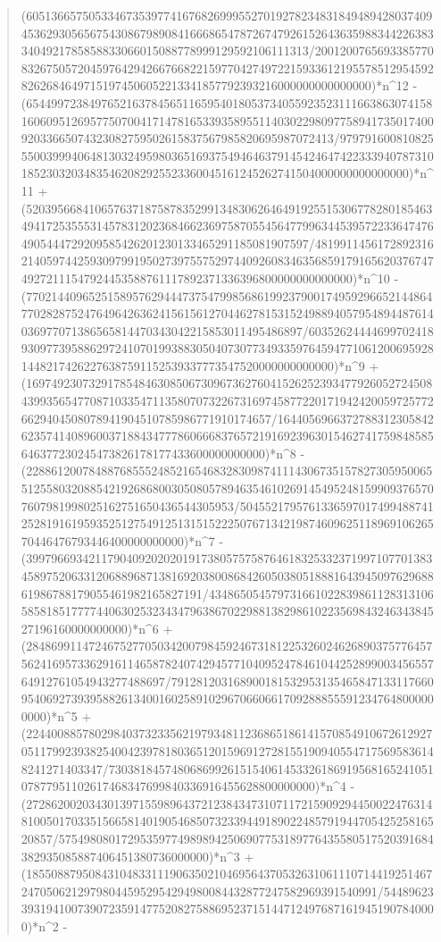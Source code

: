 \documentclass[11pt,a4paper]{article}
\theoremstyle{plain}
\theoremstyle{definition}
\begin{document}
\begin{quote}
(605136657505334673539774167682699955270192782348318494894280374094536293056567543086798908416668654787267479261526436359883442263833404921785858833066015088778999129592106111313/200120076569338577083267505720459764294266766822159770427497221593361219557851295459282626846497151974506052213341857792393216000000000000000)*n\^{}12 - (6544997238497652163784565116595401805373405592352311166386307415816060951269577507004171478165339358955114030229809775894173501740092033665074323082759502615837567985820695987072413/97979160081082555003999406481303249598036516937549464637914542464742233394078731018523032034835462082925523360045161245262741504000000000000000)*n\^{}11 + (520395668410657637187587835299134830626464919255153067782801854634941725355531457831202368466236975870554564779963445395722336474764905444729209585426201230133465291185081907597/481991145617289231621405974425930979919502739755752974409260834635685917916562037674749272111547924453588761117892371336396800000000000000)*n\^{}10 - (77021440965251589576294447375479985686199237900174959296652144864770282875247649642636241561561270446278153152498894057954894487614036977071386565814470343042215853011495486897/6035262444469970241893097739588629724107019938830504073077349335976459477106120069592814482174262276387591152539337773547520000000000000)*n\^{}9 + (169749230732917854846308506730967362760415262523934779260527245084399356547708710335471135807073226731697458772201719424200597257726629404508078941904510785986771910174657/1644056966372788312305842623574140896003718843477786066683765721916923963015462741759848585646377230245473826178177433600000000000)*n\^{}8 - (228861200784887685552485216546832830987411143067351578273059500655125580320885421926868003050805789463546102691454952481599093765707607981998025162751650436544305953/504552179576133659701749948874125281916195935251275491251315152225076713421987460962511896910626570446476793446400000000000)*n\^{}7 - (3997966934211790409202020191738057575876461832533237199710770138345897520633120688968713816920380086842605038051888164394509762968861986788179055461982165827191/43486505457973166102283986112831310658581851777744063025323434796386702298813829861022356984324634384527196160000000000)*n\^{}6 + (2848699114724675277050342007984592467318122532602462689037577645756241695733629161146587824074294577104095247846104425289900345655764912761054943277488697/7912812031689001815329531354658471331176609540692739395882613400160258910296706606617092888555912347648000000000)*n\^{}5 + (224400885780298403732335621979348112368651861415708549106726129270511799239382540042397818036512015969127281551909405547175695836148241271403347/730381845748068699261515406145332618691956816524105107877951102617468347699840336916455628800000000)*n\^{}4 - (2728620020343013971559896437212384347310711721590929445002247631481005017033515665814019054685073233944918902248579194470542525816520857/575498080172953597749898942506907753189776435580517520391684382935085887406451380736000000)*n\^{}3 + (18550887950843104833111906350210469564370532631061110714419251467247050621297980445952954294980084432877247582969391540991/544896233931941007390723591477520827588695237151447124976871619451907840000)*n\^{}2 - 
\end{quote}
\end{document}
